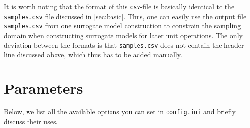 \documentclass[a4paper,bibliography=numbered]{scrartcl}
\begin{document}
It is worth noting that the format of this \texttt{csv}-file is basically identical to the \texttt{samples.csv} file discussed in \cref{sec:basic}.
Thus, one can easily use the output file \texttt{samples.csv} from one surrogate model construction to constrain the sampling domain when constructing surrogate models for later unit operations.
The only deviation between the formats is that \texttt{samples.csv} does not contain the header line discussed above, which thus has to be added manually.



\section{Parameters}\label{sec:param}
Below, we list all the available options you can set in \texttt{config.ini} and briefly discuss their uses.
\end{document}
